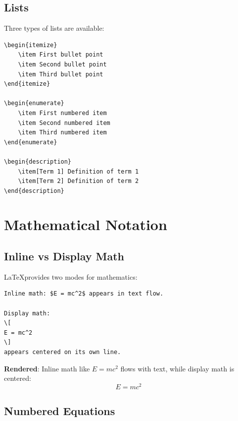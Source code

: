 \subsection*{Lists}

Three types of lists are available:

\begin{verbatim}
\begin{itemize}
    \item First bullet point
    \item Second bullet point
    \item Third bullet point
\end{itemize}

\begin{enumerate}
    \item First numbered item
    \item Second numbered item
    \item Third numbered item
\end{enumerate}

\begin{description}
    \item[Term 1] Definition of term 1
    \item[Term 2] Definition of term 2
\end{description}
\end{verbatim}

\section*{Mathematical Notation}

\subsection*{Inline vs Display Math}

\LaTeX provides two modes for mathematics:

\begin{verbatim}
Inline math: $E = mc^2$ appears in text flow.

Display math:
\[
E = mc^2
\]
appears centered on its own line.
\end{verbatim}

\textbf{Rendered}: Inline math like $E = mc^2$ flows with text, while display math is centered:
\[
    E = mc^2
\]

\subsection*{Numbered Equations}

